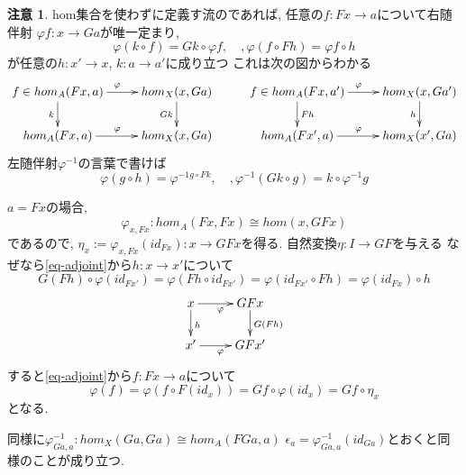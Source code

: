 \documentclass[dvipdfmx,a4paper,11pt]{article}
\theoremstyle{definition}
\newtheorem{rem}[thm]{注意}
\begin{document}
\begin{rem}
hom集合を使わずに定義す流のであれば, 
任意の$f : Fx \to a$について右随伴射
$\varphi f : x \to Ga$が唯一定まり, 
\begin{equation}
\label{eq-adjoint}
\varphi(k \circ f) = Gk \circ \varphi f, \quad, \varphi(f \circ Fh) = \varphi f \circ h 
\end{equation}
が任意の$h : x' \to x$, $k : a \to a'$に成り立つ
これは次の図からわかる
\begin{equation*}
\xymatrix@C=25pt@R=20pt{
f \in hom_{A}(Fx, a) \ar@{->}[d] _{k} \ar@{->}[r]^{\varphi}&  
hom_{X}(x, Ga) \ar@{->}[d]_{Gk}   & 
f \in hom_{A}(Fx, a') \ar@{->}[d]^{Fh} \ar@{->}[r]^{\varphi} &
hom_{X}(x, Ga') \ar@{->}[d]_{h} \\
hom_{A}(Fx, a) 	\ar@{->}[r]^{\varphi} 	 &  
hom_{X}(x, Ga)  & 
hom_{A}(Fx', a)	\ar@{->}[r]^{\varphi} &
hom_{X}(x', Ga) \\
}
\end{equation*}
左随伴射$\varphi^{-1}$の言葉で書けば
$$
\varphi(g \circ h) = \varphi^{-1 g \circ Fk}, \quad, 
\varphi^{-1}(Gk \circ g) = k \circ \varphi^{-1}g
$$
\end{rem}

$a=Fx$の場合, 
$$
\varphi_{x,Fx} : hom_{A}(Fx, Fx) \cong hom(x, GFx)
$$
であるので, $\eta_x := \varphi_{x,Fx}(id_{Fx}) : x \to GFx$を得る.
自然変換$\eta : I \to GF$を与える
なぜなら\ref{eq-adjoint}から$h: x \to x'$について
$$
G(Fh) \circ \varphi(id_{Fx'}) 
=
\varphi( Fh \circ id_{Fx'})
=
\varphi(id_{Fx'} \circ Fh)
=
\varphi(id_{Fx}) \circ h
$$
\begin{equation*}
\xymatrix@C=25pt@R=20pt{
x \ar@{->}[d]^{h}\ar@{->}[r]_{\varphi}&
 GFx\ar@{->}[d]^{G(Fh)}\\
x'\ar@{->}[r]_{\varphi}& 
GFx'\\   
}
\end{equation*}
すると\ref{eq-adjoint}から$f : Fx \to a$について
$$
\varphi(f ) = \varphi(f \circ F(id_{x})) = Gf \circ  \varphi(id_x)= Gf \circ \eta_x
$$
となる.

同様に$\varphi^{-1}_{Ga, a} :  hom_{X}(Ga, Ga) \cong hom_{A}(FGa, a)$
$\epsilon_a = \varphi^{-1}_{Ga, a}(id_{Ga})$とおくと同様のことが成り立つ. 
\end{document}
